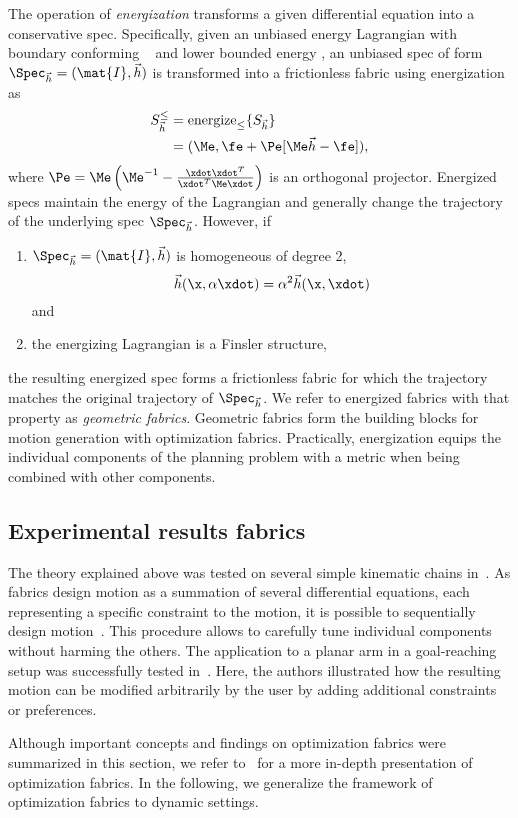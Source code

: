 The operation of \textit{energization} transforms a given differential equation into
a conservative spec.
Specifically, given an unbiased energy Lagrangian \le{} with boundary conforming
\Me{}~\cite[Definition~4.6]{Ratliff2020} and
lower bounded energy \he{}, an unbiased spec of form $\Spec_{\vec{h}} = (\mat{I},\vec{h})$
is transformed into a frictionless fabric using energization as
\begin{equation}
  \begin{split}
  S_{\vec{h}}^{\le} &= \text{energize}_{\le}\{S_{\vec{h}}\} \\
    &= (\Me, \fe + \Pe[\Me\vec{h} - \fe]), 
  \end{split}
\end{equation}
where $\Pe = \Me\left(\Me^{-1} - \frac{\xdot\xdot^T}{\xdot^T\Me\xdot}\right)$ is an
orthogonal projector.
Energized specs maintain the energy of the Lagrangian and generally change
the trajectory of the underlying spec $\Spec_{\vec{h}}$.
However, if 
\begin{enumerate}
  \item $\Spec_{\vec{h}} = (\mat{I},\vec{h})$ is homogeneous of degree 2,
    \begin{equation}\vec{h}(\x, \alpha\xdot) = \alpha^2\vec{h}(\x, \xdot)\label{eq:homogeneous}\end{equation}
    and
  \item the energizing Lagrangian is a Finsler structure, 
\end{enumerate}
the resulting energized spec forms a frictionless fabric for which the trajectory matches
the original trajectory of $\Spec_{\vec{h}}$. We refer to energized fabrics with that
property as \textit{geometric fabrics}. Geometric fabrics form the building blocks for
motion generation with optimization fabrics.
Practically, energization equips the individual components of the planning problem
with a metric when being combined with other components.


\subsection{Experimental results fabrics}%
\label{sub:experimental_results_fabrics}

The theory explained above was tested on several simple kinematic chains
in~\cite{Ratliff2020,Ratliff2021}. As fabrics design motion as a summation of several
differential equations, each representing a specific constraint to the motion, it is
possible to sequentially design motion~\cite{Ratliff2020}. This procedure allows to
carefully tune individual components without harming the others. The application to a
planar arm in a goal-reaching setup was successfully tested in~\cite{Ratliff2020}. Here,
the authors illustrated how the resulting motion can be modified arbitrarily by the user
by adding additional constraints or preferences.

Although important concepts and findings on optimization fabrics were summarized in this
section, we refer to~\cite{Ratliff2020} for a more in-depth presentation of optimization
fabrics. In the following, we generalize the framework of optimization fabrics to dynamic settings.
